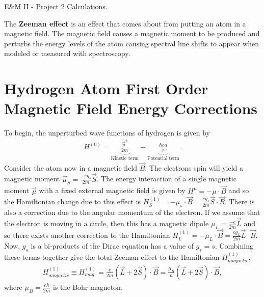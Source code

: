\documentclass[11pt]{article}
\begin{document}
 

\begin{center}
	{\Large E\&M II - Project 2 Calculations.}
\end{center}

The \textbf{Zeeman effect} is an effect that comes about from putting an atom in a magnetic field. The magnetic field causes a magnetic moment to be produced and perturbs the energy levels of the atom causing spectral line shifts to appear when modeled or measured with spectroscopy. 

\section{Hydrogen Atom First Order Magnetic Field Energy Corrections}
To begin, the unperturbed wave functions of hydrogen is given by 
\begin{align}
H^{(0)} = \underbrace{\frac{\vec{p}^2}{2m}}_{\textrm{Kinetic term}}-\underbrace{\frac{\hbar c \alpha}{r}}_{\textrm{Potential term}}.
\end{align}
Consider the atom now in a magnetic field $\vec{B}$. The electrons spin will yield a magnetic moment $\vec{\mu}_S=\frac{-eg_s}{2m}\vec{S}$. The energy interaction of a single magnetic moment $\vec{\mu}$ with a fixed external magnetic field is given by $H^{\mu}= - \mu \cdot \vec{B}$ and so the Hamiltonian change due to this effect is $H_{S}^{(1)} =  -\mu_s \cdot \vec{B} = \frac{eg_s}{2m}\vec{S}\cdot \vec{B}$. There is also a correction due to the angular momentum of the electron. If we assume that the electron is moving in a circle, then this has a magnetic dipole $\mu_L = \frac{-e}{2m}\vec{L}$ and so there exists another correction to the Hamiltonian $H_L^{(1)} = -\mu_L \cdot\vec{B} = \frac{eg_L}{2m}\vec{L}\cdot \vec{B}$. Now, $g_s$ is a bi-products of the Dirac equation has a value of $g_s=s$. Combining these terms together give the total Zeeman effect to the Hamiltonian $H_{magnetic}^{(1)}$,
\begin{align}
H_{magnetic}^{(1)} \equiv H_{mag}^{(1)}= \frac{e}{2m}(\vec{L}+2\vec{S})\cdot \vec{B} = \frac{\mu_B}{\hbar}(\vec{L}+2\vec{S})\cdot \vec{B},
\end{align} 
where $\mu_B=\frac{e\hbar}{2m}$ is the Bohr magneton.
\end{document}
